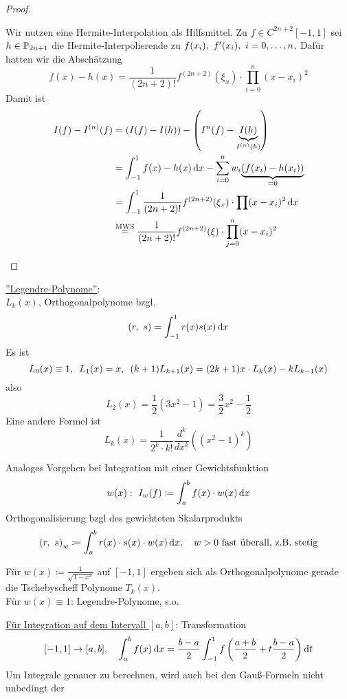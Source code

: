 \documentclass[11pt,a4paper,oneside]{scrartcl}
\begin{document}
{\begin{proof}
\begin{description}
    Wir nutzen eine Hermite-Interpolation als Hilfsmittel. Zu $f\in C^{2n+2}[-1,1]$ sei
    $h \in \Pol{2n+1}$ die Hermite-Interpolierende zu $f(x_i), \ f'(x_i), \ i = 0,\dots, n$. Dafür hatten
    wir die Abschätzung\[
        f(x) - h(x) = \frac{1}{(2n+2)!} f^{(2n+2)}(\xi_x)\cdot\prod_{i=0}^n (x-x_i)^2\]
    Damit ist 
    \begin{align*}
        I(f) - I^{(n)}(f) &= \left(I(f) - I(h)\right) - \left(I^{n}(f) - \underset{I^{(n)}(h)}{\underbrace{I(h)}}\right)\\
        &= \int_{-1}^1 f(x)-h(x)\mathop{}\!\mathrm{d} x - \sum_{i=0}^n w_i\underset{=0}{\underbrace{(f(x_i) - h(x_i))}}\\
        &= \int_{-1}^1 \frac{1}{(2n+2)!}f^{(2n+2)}(\xi_x)\cdot\prod(x-x_i)^2\mathop{}\!\mathrm{d} x\\
        &\overset{\text{MWS}}{=} \frac{1}{(2n+2)!}f^{(2n+2)}(\xi)\cdot\prod_{j=0}^n(x-x_i)^2
    \end{align*}
    \end{description}
\end{proof}
\underline{''Legendre-Polynome''}:\\
    $L_k(x)$, Orthogonalpolynome bzgl. \[\left(r,\ s\right) = \int_{-1}^1 r(x)s(x)\mathop{}\!\mathrm{d} x\]
    Es ist \[
        L_0(x) \equiv 1, \hspace{.5em} L_1(x) = x, \hspace{.5em} (k+1)L_{k+1}(x) = (2k+1)x\cdot L_k(x) - kL_{k-1}(x)\]
    also \[
        L_2(x) = \frac{1}{2}(3x^2 - 1) = \frac{3}{2}x^2 - \frac{1}{2}\]
    Eine andere Formel ist \[
        L_k(x) = \frac{1}{2^k\cdot k!}\frac{d^k}{dx^k}\left((x^2-1)^k\right)\]
\begin{remark}
    Analoges Vorgehen bei Integration mit einer Gewichtsfunktion \[
        w(x): \ I_w(f) \coloneqq \int_a^b f(x)\cdot w(x)\mathop{}\!\mathrm{d} x\]
    Orthogonalisierung bzgl des gewichteten Skalarprodukts \[
        \left(r,\ s\right)_w \coloneqq \int_a^b r(x)\cdot s(x)\cdot w(x)\mathop{}\!\mathrm{d} x, \hspace{1em} w>0\text{ fast überall, z.B. stetig}\]
\end{remark}
\begin{example}
    Für $w(x) \coloneqq \frac{1}{\sqrt{1-x^2}}$ auf $[-1,1]$ ergeben sich als Orthogonalpolynome 
    gerade die Tschebyscheff Polynome $T_k(x)$.\\
    Für $w(x)\equiv 1$: Legendre-Polynome, s.o.
\end{example}
\underline{Für Integration auf dem Intervall $[a,b]$}: Transformation \[[-1,1]\to [a,b],\hspace{1em} \int_a^b f(x)\mathop{}\!\mathrm{d} x = 
\frac{b-a}{2}\int_{-1}^1 f\left(\frac{a+b}{2}+ t\frac{b-a}{2}\right)\mathop{}\!\mathrm{d} t\] 
Um Integrale genauer zu berechnen, wird auch bei den Gauß-Formeln nicht unbedingt der
}
\end{document}
